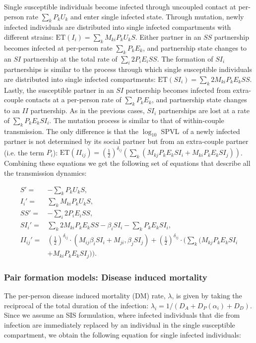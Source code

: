 \documentclass[10pt,letterpaper]{article}
\newcommand{\khalf}{\left(\frac{1}{2}\right)^{\delta_{ij}}}  %
\newcommand{\Lspvl}{$\log_{10}$ SPVL}
\newcommand{\ET}{\textrm{ET}}
\begin{document}
Single susceptible individuals become infected through uncoupled contact at per-person rate $\sum_k P_k U_k$ and enter single infected state. Through mutation, newly infected individuals are distributed into single infected compartments with different strains: $\ET(I_i) = \sum_k M_{ki} P_k U_k S$. Either partner in an $SS$ partnership becomes infected at per-person rate $\sum_k P_k E_k$, and partnership state changes to an $SI$ partnership at the total rate of $\sum_i 2 P_i E_i SS$. The formation of $SI_i$ partnerships is similar to the process through which single susceptible individuals are distributed into single infected compartments: $\ET(SI_i) = \sum_k 2 M_{ki} P_k E_k SS$. Lastly, the susceptible partner in an $SI$ partnership becomes infected from extra-couple contacts at a per-person rate of $\sum_k P_k E_k$, and partnership state changes to an $II$ partnership. As in the previous cases, $SI_i$ partnerships are lost at a rate of $\sum_k P_k E_k SI_i$. The mutation process is similar to that of within-couple transmission. The only difference is that the \Lspvl\ of a newly infected partner is not determined by its social partner but from an extra-couple partner (i.e. the term $P_i$): $\ET(II_{ij}) = (\frac{1}{2})^{\delta_{ij}}(\sum_k (M_{kj} P_k E_k SI_i + M_{ki} P_k E_k SI_j))$. Combining these equations we get the following set of equations that describe all the transmission dynamics:

\begin{equation}
\begin{aligned}
S' =& - \sum_k P_k U_k S,\\
I_i' =& \sum_k M_{ki} P_k U_k S,\\
SS' =&  - \sum_i 2 P_i E_i SS, \\
SI_i' =& \sum_k 2 M_{ki} P_k E_k SS - \beta_i SI_i - \sum_k P_k E_k SI_i,\\
II_{ij}' =& \khalf \cdot (M_{ij} \beta_i SI_i + M_{ji}, \beta_j SI_j) + \khalf \cdot (\sum_k (M_{kj} P_k E_k SI_i\\
&+ M_{ki} P_k E_k SI_j)).
\end{aligned}
\end{equation}

\subsubsection*{Pair formation models: Disease induced mortality}

The per-person disease induced mortality (DM) rate, $\lambda$, is given by taking the reciprocal of the total duration of the infection: $\lambda_i = 1/(D_A + D_P(\alpha_i) + D_D)$. Since we assume an SIS formulation, where infected individuals that die from infection are immediately replaced by an individual in the single susceptible compartment, we obtain the following equation for single infected individuals:
\end{document}
